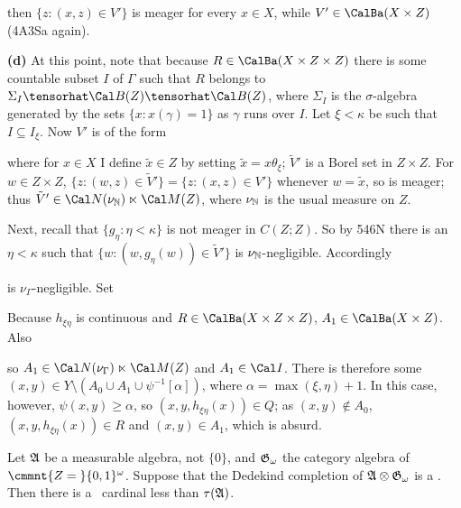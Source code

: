 {\noindent then $\{z:(x,z)\in V'\}$ is meager for every $x\in X$, while
$V'\in\CalBa(X\times Z)$ (4A3Sa again).

\medskip

{\bf (d)} At this point, note that because $R\in\CalBa(X\times Z\times Z)$
there is some countable subset $I$ of $\Gamma$ such
that $R$ belongs to $\Sigma_I\tensorhat\Cal B(Z)\tensorhat\Cal B(Z)$, where
$\Sigma_I$ is the $\sigma$-algebra generated by the sets
$\{x:x(\gamma)=1\}$ as $\gamma$ runs over $I$.   Let $\xi<\kappa$ be
such that $I\subseteq I_{\xi}$.   Now $V'$ is of the form


\noindent where for $x\in X$ I define $\tilde x\in Z$ by setting
$\tilde x=x\theta_{\xi}$;
$\tilde V'$ is a Borel set in $Z\times Z$.   For $w\in Z\times Z$,
$\{z:(w,z)\in\tilde V'\}=\{z:(x,z)\in V'\}$ whenever $w=\tilde x$, so
is meager;  thus $\tilde V'\in\Cal N(\nu_{\Bbb N})\ltimes\Cal M(Z)$, where
$\nu_{\Bbb N}$ is the usual measure on $Z$.

Next, recall that $\{g_{\eta}:\eta<\kappa\}$ is not meager in
$C(Z;Z)$.   So by 546N
there is an $\eta<\kappa$ such that $\{w:(w,g_{\eta}(w))\in\tilde V'\}$
is $\nu_{\Bbb N}$-negligible.   Accordingly


\noindent is $\nu_{\Gamma}$-negligible.   Set


\noindent Because $h_{\xi\eta}$ is continuous and
$R\in\CalBa(X\times Z\times Z)$, $A_1\in\CalBa(X\times Z)$. Also


\noindent so $A_1\in\Cal N(\nu_{\Gamma})\ltimes\Cal M(Z)$ and $A_1\in\Cal I$.
There is therefore some
$(x,y)\in Y\setminus(A_0\cup A_1\cup\psi^{-1}[\alpha])$, where
$\alpha=\max(\xi,\eta)+1$.   In this case, however,
$\psi(x,y)\ge\alpha$, so $(x,y,h_{\xi\eta}(x))\in Q$;  as $(x,y)\notin A_0$,
$(x,y,h_{\xi\eta}(x))\in R$ and $(x,y)\in A_1$, which is absurd.\ \Bang
}%

 Let $\frak A$ be a measurable algebra, not $\{0\}$,
and $\frak G_{\omega}$ the
category algebra of $\cmmnt{Z=\mskip5mu}\{0,1\}^{\omega}$.
Suppose that the Dedekind
completion of $\frak A\otimes\frak G_{\omega}$ is a \pssqa.
Then there is a \qm\ cardinal less than $\tau(\frak A)$.

